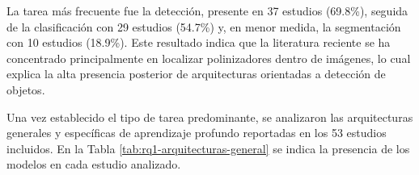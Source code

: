 \vspace{-1.0 cm}
La tarea más frecuente fue la detección, presente en 37 estudios (69.8\%), seguida de la clasificación con 29 estudios (54.7\%) y, en menor medida, la segmentación con 10 estudios (18.9\%). Este resultado indica que la literatura reciente se ha concentrado principalmente en localizar polinizadores dentro de imágenes, lo cual explica la alta presencia posterior de arquitecturas orientadas a detección de objetos.

Una vez establecido el tipo de tarea predominante, se analizaron las arquitecturas generales y específicas de aprendizaje profundo reportadas en los 53 estudios incluidos. En la Tabla \ref{tab:rq1-arquitecturas-general} se indica la presencia de los modelos en cada estudio analizado.\\

\begingroup
\newcommand{\marca}{\(\times\)}

\setlength{\tabcolsep}{2pt}
\renewcommand{\arraystretch}{1.05}
\tiny

